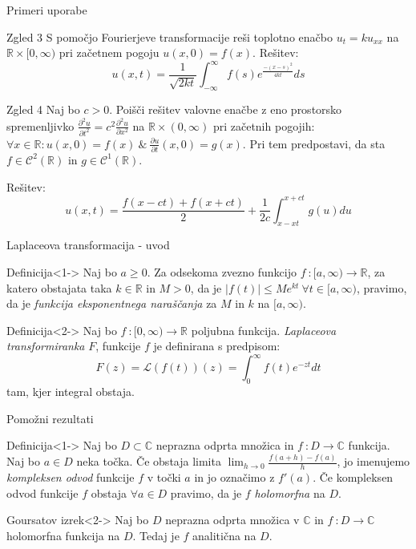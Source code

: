 \documentclass[t, 8pt]{beamer} %
\newcommand{\abs}[1]{\ensuremath{\lvert #1 \rvert}}
\newcommand{\mth}[1]{\ensuremath{\mathbb{#1}}}
\newcommand{\R}{\mth{R}}
\newcommand{\C}{\mth{C}}
\newcommand{\pojem}[1]{\emph{#1}}
\newcommand{\map}[3]{\ensuremath{{#1}~: {#2} \rightarrow {#3}}}
\newcommand{\fillblack}[1]{
	\begin{tikzpicture}[remember picture, overlay]
		\node [shift={(0 cm,0cm)}]  at (current page.south west)
		{%
			\begin{tikzpicture}[remember picture, overlay] at (current page.south west)
				\draw [fill=black] (0, 0) -- (0,#1 \paperheight) --
				(\paperwidth,#1 \paperheight) -- (\paperwidth,0) -- cycle ;
			\end{tikzpicture}
		};
		\draw (current page.north west) rectangle (current page.south east);
	\end{tikzpicture}
}
\begin{document}
		\begin{frame}{Primeri uporabe}
			\begin{block}{Zgled 3}
				S pomočjo Fourierjeve transformacije reši toplotno enačbo $u_t = ku_{xx}$ na $\R\times[0, \infty)$ pri začetnem pogoju $u(x, 0) = f(x)$. Rešitev: $$u(x, t)=\frac{1}{\sqrt{2kt}}\int_{-\infty}^{\infty} f(s)e^{\frac{-(x-s)^2}{4kt}}ds$$
			\end{block}
			\begin{block}{Zgled 4}
				Naj bo $c > 0$. Poišči rešitev valovne enačbe z eno prostorsko spremenljivko $\frac{\partial^2 u}{\partial t^2} = c^2\frac{\partial^2 u}{\partial x^2}$ na $\R\times (0, \infty)$ pri začetnih pogojih: $\forall x\in \R: u(x, 0) = f(x)~\&~\frac{\partial u}{\partial t}(x, 0) = g(x)$. Pri tem predpostavi, da sta $f\in \mathcal{C}^2(\R)$ in $g\in\mathcal{C}^1(\R)$.
				
				Rešitev: $$u(x, t) = \frac{f(x-ct) + f(x+ct)}{2} + \frac{1}{2c}\int_{x-xt}^{x+ct}g(u)du$$
			\end{block}
		\end{frame}
		
		\begin{frame}{Laplaceova transformacija - uvod}
			\begin{block}{Definicija}<1->
				Naj bo $a\geq 0$. Za odsekoma zvezno funkcijo $\map{f}{[a, \infty)}{\R}$, za katero obstajata taka $k\in \R$ in $M > 0$, da je $\abs{f(t)}\leq Me^{kt}~\forall t\in [a, \infty)$, pravimo, da je \pojem{funkcija eksponentnega naraščanja} za $M$ in $k$ na $[a,\infty)$.
			\end{block}
			\begin{block}{Definicija}<2->
				Naj bo $\map{f}{[0, \infty)}{\R}$ poljubna funkcija. \pojem{Laplaceova transformiranka} $F$, funkcije $f$ je definirana s predpisom: $$F(z) = \mathcal{L}(f(t))(z) = \int_{0}^{\infty}f(t)e^{-zt}dt$$ tam, kjer integral obstaja.
			\end{block}
		\end{frame}
		
		\begin{frame}{Pomožni rezultati}
			\begin{block}{Definicija}<1->
				Naj bo $D\subset\C$ neprazna odprta množica in $\map{f}{D}{\C}$ funkcija. Naj bo $a\in D$ neka točka. Če obstaja limita $\lim_{h\to 0}\frac{f(a+h)-f(a)}{h}$, jo imenujemo \pojem{kompleksen odvod} funkcije $f$ v točki $a$ in jo označimo z $f'(a)$. Če kompleksen odvod funkcije $f$ obstaja $\forall a\in D$ pravimo, da je $f$ \pojem{holomorfna} na $D$.
			\end{block}
			
			\begin{block}{Goursatov izrek}<2->
				Naj bo $D$ neprazna odprta množica v $\C$ in $\map{f}{D}{\C}$ holomorfna funkcija na $D$. Tedaj je $f$ analitična na $D$.
			\end{block}
		\end{frame}
		
\end{document}
